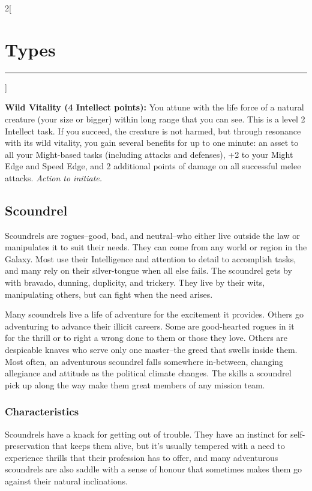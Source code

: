 \documentclass[a4paper,10pt,final]{book}
\newcommand{\HRule}{\rule{\linewidth}{0.5mm}} %
\newcommand{\newSection}[1]{\section*{#1} \addcontentsline{toc}{section}{#1} \label{sec:#1} \HRule}
\newcommand{\itemAbility}[2]{\textcolor{25gray}{\textbullet\textbf{ #1:}} {#2}\par}
\newcommand{\actionInit}{\textit{ Action to initiate.}}
\newenvironment{docsection}[1]
{
  \begin{multicols*}{2}[\newSection{#1}]
}
{
  \end{multicols*}
  \newpage
}
\begin{document}
\begin{docsection}{Types}
\itemAbility{Wild Vitality (4 Intellect points)}{You attune with the life force of a natural creature (your size or bigger) within long range that you can see. This is a level 2 Intellect task. If you succeed, the creature is not harmed, but through resonance with its wild vitality, you gain several benefits for up to one minute: an asset to all your Might-based tasks (including attacks and defenses), +2 to your Might Edge and Speed Edge, and 2 additional points of damage on all successful melee attacks.\actionInit}



\subsection*{Scoundrel} %
\label{sub:scoundrel}
Scoundrels are rogues--good, bad, and neutral--who either live outside the law or manipulates it to suit their needs. They can come from any world or region in the Galaxy. Most use their Intelligence and attention to detail to accomplish tasks, and many rely on their silver-tongue when all else fails. The scoundrel gets by with bravado, dunning, duplicity, and trickery. They live by their wits, manipulating others, but can fight when the need arises.\par

Many scoundrels live a life of adventure for the excitement it provides. Others go adventuring to advance their illicit careers. Some are good-hearted rogues in it for the thrill or to right a wrong done to them or those they love. Others are despicable knaves who serve only one master--the greed that swells inside them. Most often, an adventurous scoundrel falls somewhere in-between, changing allegiance and attitude as the political climate changes. The skills a scoundrel pick up along the way make them great members of any mission team.

\subsubsection*{Characteristics}
\label{subsub:scoundrelCharacteristics}
Scoundrels have a knack for getting out of trouble. They have an instinct for self-preservation that keeps them alive, but it's usually tempered with a need to experience thrills that their profession has to offer, and many adventurous scoundrels are also saddle with a sense of honour that sometimes makes them go against their natural inclinations. \par


\end{docsection}
\end{document}

